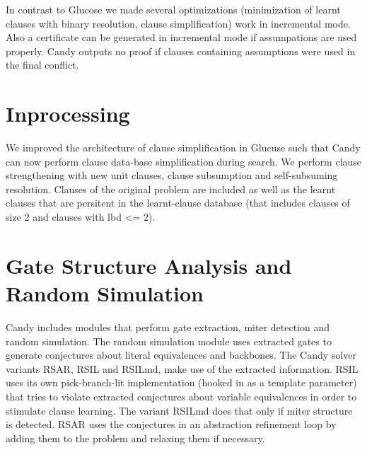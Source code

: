 \documentclass{llncs}
\begin{document}
In contrast to Glucose we made several optimizations (minimization of learnt clauses with binary resolution, clause simplification) work in incremental mode. Also a certificate can be generated in incremental mode if assumpations are used properly. Candy outputs no proof if clauses containing assumptions were used in the final conflict. 

\section{Inprocessing}

We improved the architecture of clause simplification in Glucuse such that Candy can now perform clause data-base simplification during search. We perform clause strengthening with new unit clauses, clause subsumption and self-subsuming resolution. Clauses of the original problem are included as well as the learnt clauses that are persitent in the learnt-clause database (that includes clauses of size 2 and clauses with lbd <= 2). 

\section{Gate Structure Analysis and Random Simulation}

Candy includes modules that perform gate extraction, miter detection and random simulation. The random simulation module uses extracted gates to generate conjectures about literal equivalences and backbones. The Candy solver variants RSAR, RSIL and RSILmd, make use of the extracted information. RSIL uses its own pick-branch-lit implementation (hooked in as a template parameter) that tries to violate extracted conjectures about variable equivalences in order to stimulate clause learning. The variant RSILmd does that only if miter structure is detected. RSAR uses the conjectures in an abstraction refinement loop by adding them to the problem and relaxing them if necessary. 
    


%

\end{document}
